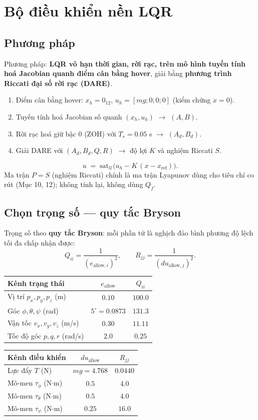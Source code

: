 \documentclass[11pt]{article}
\newcommand{\xref}{x_{\mathrm{ref}}}
\begin{document}
\section{Bộ điều khiển nền LQR}
\subsection{Phương pháp}
Phương pháp: \textbf{LQR vô hạn thời gian, rời rạc, trên mô hình tuyến tính hoá Jacobian quanh điểm cân
bằng hover}, giải bằng \textbf{phương trình Riccati đại số rời rạc (DARE)}.
\begin{enumerate}[leftmargin=1.6em,itemsep=1pt]
\item Điểm cân bằng hover: $x_h=0_{12}$, $u_h=[mg;0;0;0]$ (kiểm chứng $\dot x=0$).
\item Tuyến tính hoá Jacobian số quanh $(x_h,u_h)$ $\rightarrow$ $(A,B)$.
\item Rời rạc hoá giữ bậc 0 (ZOH) với $T_s=0.05$ s $\rightarrow$ $(A_d,B_d)$.
\item Giải DARE với $(A_d,B_d,Q,R)$ $\rightarrow$ độ lợi $K$ và nghiệm Riccati $S$.
\end{enumerate}
\[
u \;=\; \mathrm{sat}_{\mathcal U}\big(u_h - K\,(x-\xref)\big).
\]
Ma trận $\boxed{P=S}$ (nghiệm Riccati) chính là ma trận Lyapunov dùng cho tiêu chí co rút (Mục 10, 12);
không tính lại, không dùng $Q_f$.

\subsection{Chọn trọng số — quy tắc Bryson}
Trọng số theo \textbf{quy tắc Bryson}: mỗi phần tử là nghịch đảo bình phương độ lệch tối đa chấp nhận
được:
\[
Q_{ii}=\frac{1}{(e_{\mathrm{allow},i})^2},\qquad
R_{jj}=\frac{1}{(du_{\mathrm{allow},j})^2}.
\]
\begin{center}\small
\begin{tabular}{@{}p{4.6cm} c c@{}}
\toprule
\textbf{Kênh trạng thái} & \textbf{$e_{\mathrm{allow}}$} & \textbf{$Q_{ii}$}\\
\midrule
Vị trí $p_x,p_y,p_z$ (m) & $0.10$ & $100.0$\\
Góc $\phi,\theta,\psi$ (rad) & $5^\circ=0.0873$ & $131.3$\\
Vận tốc $v_x,v_y,v_z$ (m/s) & $0.30$ & $11.11$\\
Tốc độ góc $p,q,r$ (rad/s) & $2.0$ & $0.25$\\
\bottomrule
\end{tabular}\qquad
\begin{tabular}{@{}p{3.0cm} c c@{}}
\toprule
\textbf{Kênh điều khiển} & \textbf{$du_{\mathrm{allow}}$} & \textbf{$R_{jj}$}\\
\midrule
Lực đẩy $T$ (N) & $mg=4.768$ & $0.0440$\\
Mô-men $\tau_\phi$ (N$\cdot$m) & $0.5$ & $4.0$\\
Mô-men $\tau_\theta$ (N$\cdot$m) & $0.5$ & $4.0$\\
Mô-men $\tau_\psi$ (N$\cdot$m) & $0.25$ & $16.0$\\
\bottomrule
\end{tabular}
\end{center}
\end{document}
